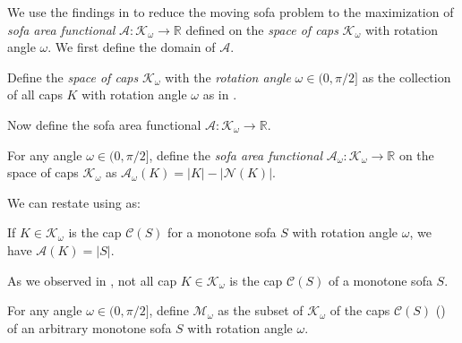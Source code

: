 We use the findings in  to reduce the moving sofa problem to the maximization of \emph{sofa area functional} \(\mathcal{A} : \mathcal{K}_\omega \to \mathbb{R}\) defined on the \emph{space of caps} \(\mathcal{K}_\omega\) with rotation angle \(\omega\). We first define the domain of \(\mathcal{A}\).

\begin{definition}

Define the \emph{space of caps} \(\mathcal{K}_\omega\) with the \emph{rotation angle} \(\omega \in (0, \pi/2]\) as the collection of all caps \(K\) with rotation angle \(\omega\) as in .

\label{def:cap-space}
\end{definition}

Now define the sofa area functional \(\mathcal{A} : \mathcal{K}_\omega \to \mathbb{R}\).

\begin{definition}

For any angle \(\omega \in (0, \pi/2]\), define the \emph{sofa area functional} \(\mathcal{A}_\omega : \mathcal{K}_\omega \to \mathbb{R}\) on the space of caps \(\mathcal{K}_\omega\) as \(\mathcal{A}_\omega(K) = |K| - |\mathcal{N}(K)|\).

\label{def:sofa-area-functional}
\end{definition}

We can restate  using  as:

\begin{corollary}

If \(K \in \mathcal{K}_\omega\) is the cap \(\mathcal{C}(S)\) for a monotone sofa \(S\) with rotation angle \(\omega\), we have \(\mathcal{A}(K) = |S|\).

\label{cor:sofa-area-functional}
\end{corollary}

As we observed in , not all cap \(K \in \mathcal{K}_\omega\) is the cap \(\mathcal{C}(S)\) of a monotone sofa \(S\).

\begin{definition}

For any angle \(\omega \in (0, \pi/2]\), define \(\mathcal{M}_\omega\) as the subset of \(\mathcal{K}_\omega\) of the caps \(\mathcal{C}(S)\) () of an arbitrary monotone sofa \(S\) with rotation angle \(\omega\).

\label{def:monotone-sofa-embedding}
\end{definition}

